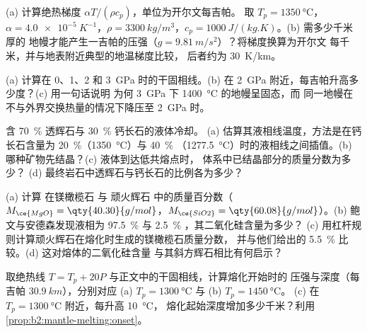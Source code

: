 \begin{exercise}[$\star$]\label{exo:b2:mantle-melting:3}
(a) 计算绝热梯度 $\alpha T/(\rho c_p)$，单位为开尔文每吉帕。
取 $T_p = \qty{1350}{\celsius}$，$\alpha = \qty{4.0e-5}{K^{-1}}$，$\rho =
\qty{3300}{kg/m^3}$，$c_p = \qty{1000}{J/(kg.K)}$。(b) 需多少千米厚的
地幔才能产生一吉帕的压强（$g = \qty{9.81}{m/s^2}$）？将梯度换算为开尔文
每千米，并与地表附近典型的地温梯度比较，
后者约为 \qty{30}{K/km}。
\end{exercise}

\begin{exercise}[$\star$]\label{exo:b2:mantle-melting:4}
(a) 计算在 0、1、2 和 \qty{3}{GPa} 时的干固相线。(b) 在
\qty{2}{GPa} 附近，每吉帕升高多少度？(c) 用一句话说明
为何 \qty{3}{GPa} 下 \qty{1400}{\celsius} 的地幔呈固态，而
同一地幔在不与外界交换热量的情况下降压至 \qty{2}{GPa} 时。
\end{exercise}

\begin{exercise}[$\star\star$]\label{exo:b2:mantle-melting:5}
含 \qty{70}{\percent} 透辉石与 \qty{30}{\percent} 钙长石的液体冷却。
(a) 估算其液相线温度，方法是在钙长石含量为
\qty{20}{\percent}（\qty{1350}{\celsius}）与 \qty{40}{\percent}
（\qty{1277.5}{\celsius}）时的液相线之间插值。(b) 哪种矿物先结晶？(c) 液体到达低共熔点时，
体系中已结晶部分的质量分数为多少？
(d) 最终岩石中透辉石与钙长石的比例各为多少？
\end{exercise}

\begin{exercise}[$\star\star$]\label{exo:b2:mantle-melting:6}
(a) 计算  在镁橄榄石  与
顽火辉石  中的质量百分数（$M_{\ce{MgO}} = \qty{40.30}{g/mol}$，$M_{\ce{SiO2}} =
\qty{60.08}{g/mol}$）。(b) 鲍文与安德森发现液相为
\qty{97.5}{\percent}  与 \qty{2.5}{\percent} ，其二氧化硅含量为多少？
(c) 用杠杆规则计算顽火辉石在熔化时生成的镁橄榄石质量分数，
并与他们给出的
\qty{5.5}{\percent} 比较。(d) 这对熔体的二氧化硅含量
与其斜方辉石相比有何启示？
\end{exercise}

\begin{exercise}[$\star\star$]\label{exo:b2:mantle-melting:7}
取绝热线 $T = T_p + 20P$ 与正文中的干固相线，计算熔化开始时的
压强与深度（每吉帕 $\qty{30.9}{km}$），分别对应
(a) $T_p = \qty{1300}{\celsius}$ 与 (b) $T_p = \qty{1450}{\celsius}$。
(c) 在 $T_p = \qty{1300}{\celsius}$ 附近，每升高 \qty{10}{\celsius}，
熔化起始深度增加多少千米？利用\cref{prop:b2:mantle-melting:onset}。
\end{exercise}

